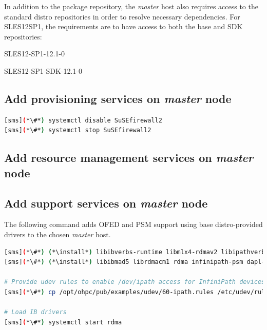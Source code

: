 \documentclass[letterpaper]{article}
\newcommand{\baseOS}{SLES12SP1}
\newcommand{\install}{zypper -n install}
\begin{document}
In addition to the \OHPC{} package repository, the {\em master} host also
requires access to the standard distro repositories in order to resolve
necessary dependencies. For \baseOS{}, the requirements are to have access to
both the base and SDK repositories:

\begin{itemize*}
\item SLES12-SP1-12.1-0
\item SLES12-SP1-SDK-12.1-0
\end{itemize*}



\subsection{Add provisioning services on {\em master} node} \label{sec:add_provisioning}



\begin{lstlisting}[language=bash,keywords={}]
[sms](*\#*) systemctl disable SuSEfirewall2
[sms](*\#*) systemctl stop SuSEfirewall2
\end{lstlisting}



\subsection{Add resource management services on {\em master} node} \label{sec:add_rm}


\subsection{Add \InfiniBand{} support services on {\em master} node} \label{sec:add_ofed}

The following command adds OFED and PSM support using base distro-provided drivers
to the chosen {\em master} host.

\begin{lstlisting}[language=bash,keywords={}]
[sms](*\#*) (*\install*) libibverbs-runtime libmlx4-rdmav2 libipathverbs-rdmav2
[sms](*\#*) (*\install*) libibmad5 librdmacm1 rdma infinipath-psm dapl-devel dapl-utils 

# Provide udev rules to enable /dev/ipath access for InfiniPath devices
[sms](*\#*) cp /opt/ohpc/pub/examples/udev/60-ipath.rules /etc/udev/rules.d/

# Load IB drivers
[sms](*\#*) systemctl start rdma
\end{lstlisting}
\end{document}
